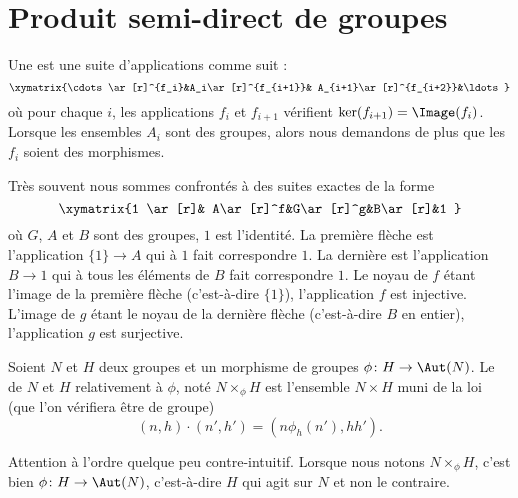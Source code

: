 
\section{Produit semi-direct de groupes}

\begin{definition}
	Une  est une suite d'applications comme suit :
	\begin{equation}
		\xymatrix{%
		\cdots \ar[r]^{f_i}&A_i\ar[r]^{f_{i+1}}& A_{i+1}\ar[r]^{f_{i+2}}&\ldots
		}
	\end{equation}
	où pour chaque \( i\), les applications \( f_i\) et \( f_{i+1}\) vérifient \( \ker(f_{i+1})=\Image(f_i)\). Lorsque les ensembles \( A_i\) sont des groupes, alors nous demandons de plus que les \( f_i\) soient des morphismes.
\end{definition}

Très souvent nous sommes confrontés à des suites exactes de la forme
\begin{equation}
	\xymatrix{%
		1 \ar[r]& A\ar[r]^f&G\ar[r]^g&B\ar[r]&1
	}
\end{equation}
où \( G\), \( A\) et \( B\) sont des groupes, \( 1\) est l'identité. La première flèche est l'application \( \{ 1 \}\to A\) qui à \( 1\) fait correspondre \( 1\). La dernière est l'application \( B\to 1\) qui à tous les éléments de \( B\) fait correspondre \( 1\). Le noyau de \( f\) étant l'image de la première flèche (c'est-à-dire \( \{ 1 \}\)), l'application \( f\) est injective. L'image de \( g\) étant le noyau de la dernière flèche (c'est-à-dire \( B\) en entier), l'application \( g\) est surjective.

\begin{definition}     \label{DEFooKWEHooISNQzi}
	Soient \( N\) et \( H\) deux groupes et un morphisme de groupes \( \phi\colon H\to \Aut(N)\). Le  de \( N\) et \( H\) relativement à \( \phi\), noté \( N\times_{\phi}H\) est l'ensemble \( N\times H\) muni de la loi (que l'on vérifiera être de groupe)
	\begin{equation}\label{EqDRgbBI}
		(n,h)\cdot (n',h')=(n\phi_h(n'),hh').
	\end{equation}
\end{definition}
Attention à l'ordre quelque peu contre-intuitif. Lorsque nous notons \( N\times_{\phi}H\), c'est bien \( \phi\colon H\to \Aut(N)\), c'est-à-dire \( H\) qui agit sur \( N\) et non le contraire.

